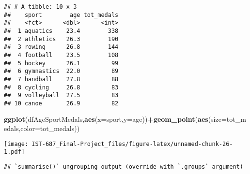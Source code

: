 \documentclass[]{article}
\newenvironment{Shaded}{\begin{snugshade}}{\end{snugshade}}
\newcommand{\CommentTok}[1]{\textcolor[rgb]{0.56,0.35,0.01}{\textit{#1}}}
\newcommand{\DataTypeTok}[1]{\textcolor[rgb]{0.13,0.29,0.53}{#1}}
\newcommand{\DecValTok}[1]{\textcolor[rgb]{0.00,0.00,0.81}{#1}}
\newcommand{\KeywordTok}[1]{\textcolor[rgb]{0.13,0.29,0.53}{\textbf{#1}}}
\newcommand{\NormalTok}[1]{#1}
\newcommand{\OperatorTok}[1]{\textcolor[rgb]{0.81,0.36,0.00}{\textbf{#1}}}
\newcommand{\StringTok}[1]{\textcolor[rgb]{0.31,0.60,0.02}{#1}}
\begin{document}
\begin{verbatim}
## # A tibble: 10 x 3
##    sport        age tot_medals
##    <fct>      <dbl>      <int>
##  1 aquatics    23.4        338
##  2 athletics   26.3        190
##  3 rowing      26.8        144
##  4 football    23.5        108
##  5 hockey      26.1         99
##  6 gymnastics  22.0         89
##  7 handball    27.8         88
##  8 cycling     26.8         83
##  9 volleyball  27.5         83
## 10 canoe       26.9         82
\end{verbatim}

\begin{Shaded}
\begin{Highlighting}[]
\KeywordTok{ggplot}\NormalTok{(dfAgeSportMedals,}\KeywordTok{aes}\NormalTok{(}\DataTypeTok{x=}\NormalTok{sport,}\DataTypeTok{y=}\NormalTok{age))}\OperatorTok{+}\KeywordTok{geom_point}\NormalTok{(}\KeywordTok{aes}\NormalTok{(}\DataTypeTok{size=}\NormalTok{tot_medals,}\DataTypeTok{color=}\NormalTok{tot_medals))}
\end{Highlighting}
\end{Shaded}

\texttt{[image: IST-687\_Final-Project\_files/figure-latex/unnamed-chunk-26-1.pdf]}

\begin{Shaded}
\end{Shaded}

\begin{verbatim}
## `summarise()` ungrouping output (override with `.groups` argument)
\end{verbatim}

\begin{Shaded}
\end{Shaded}
\end{document}
